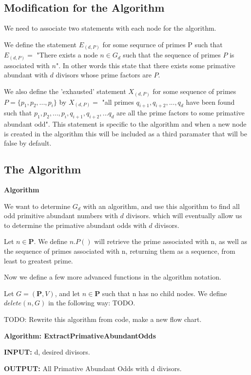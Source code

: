 \documentclass[../paper.tex]{subfiles}
\begin{document}
\subsection{Modification for the Algorithm}

We need to associate two statements with each node for the 
algorithm.

We define the statement $E_{(d,P)}$ for some sequrnce of primes P such 
that $E_{(d,P)} = $ "There exists a node $n \in G_d$ such that the
sequence 
of primes $P$ is associated with $n$". In other words this state that 
there exists some primative abundant with $d$ divisors whose prime
factors are $P$.

We also define the 'exhausted' statement $X_{(d,P)}$ for some
sequence of 
primes $P = \{p_1, p_2, ..., p_i\}$   by $X_{(d,P)} = $ "all primes 
$q_{i+1}, q_{i+2}, ..., q_d$ have been found such that $p_1,p_2, 
..., p_i, q_{i+1}, q_{i+2}, ...q_d$ are all the prime factors to some
primative abundant odd". This statement is specific to the algorithm 
and when a new node is created in the algorithm this will be included
as a third paramater that will be false by default. 


\subsection{The Algorithm}
\textbf{Algorithm} 

We want to determine $G_d$ with an algorithm, and use this
algorithm to find all odd primitive abundant numbers with $d$
divisors.  
which will eventually allow us to determine the primative abundant 
odds with $d$ divisors.

Let $n \in \mathbf{P}$.
%
We define $n.P()$ will retrieve the prime associated with n, as
well as the sequence of primes associated with n, returning them as a 
sequence, from least to greatest prime.

\noindent
Now we define a few more advanced functions in the algorithm 
notation.


Let $G = (\mathbf{P}, V)$, and
let $n \in \mathbf{P}$ such that n has no child nodes. 
%
We define $delete(n, G)$ in the following way: TODO. 

\begin {algorithmic}
\STATE TODO: Rewrite this algorithm from code, make a new flow
chart.

\end {algorithmic}

{\setlength{\parindent}{0cm}

\textbf{Algorithm: ExtractPrimativeAbundantOdds}

\textbf{INPUT:} d, desired divisors.

\textbf{OUTPUT:} All Primative Abundant Odds with d divisors.

}
\end{document}
